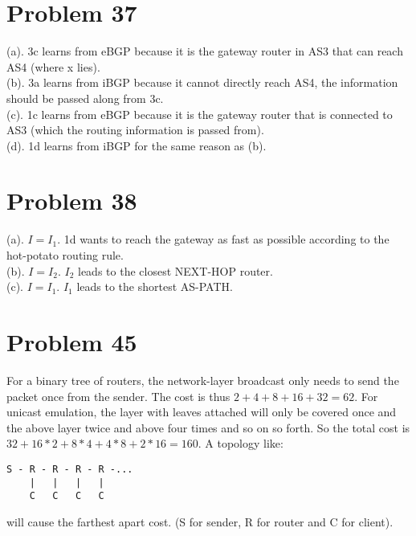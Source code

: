 \documentclass[titlepage, paper=a4, fontsize=11pt]{scrartcl} %
\numberwithin{equation}{section} %
\numberwithin{table}{section} %
\begin{document}

\section*{Problem 37}
(a).
3c learns from eBGP because it is the gateway router in AS3 that can reach AS4 (where x lies). \\

(b).
3a learns from iBGP because it cannot directly reach AS4, the information should be passed along from 3c. \\

(c).
1c learns from eBGP because it is the gateway router that is connected to AS3 (which the routing information is passed from). \\

(d).
1d learns from iBGP for the same reason as (b). \\




\section*{Problem 38}
(a).
$I = I_1$. 1d wants to reach the gateway as fast as possible according to the hot-potato routing rule. \\

(b).
$I = I_2$. $I_2$ leads to the closest NEXT-HOP router. \\

(c).
$I = I_1$. $I_1$ leads to the shortest AS-PATH. \\




\section*{Problem 45}
For a binary tree of routers, the network-layer broadcast only needs to send the packet once from the sender. The cost is thus $2+4+8+16+32=62$. For unicast emulation, the layer with leaves attached will only be covered once and the above layer twice and above four times and so on so forth. So the total cost is $32+16*2+8*4+4*8+2*16=160$.
A topology like: \\
\begin{verbatim}
S - R - R - R - R -...
    |   |   |   |
    C   C   C   C
\end{verbatim}
will cause the farthest apart cost. (S for sender, R for router and C for client).
\end{document}
